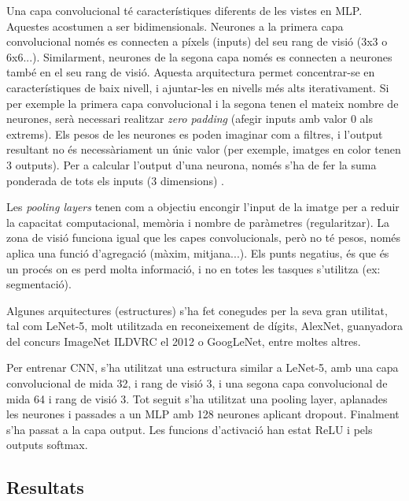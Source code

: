 \documentclass[12pt, spanish]{article}
\begin{document}
Una capa convolucional té característiques diferents de les vistes en MLP. Aquestes acostumen a ser bidimensionals. Neurones a la primera capa convolucional només es connecten a píxels (inputs) del seu rang de visió (3x3 o 6x6...). Similarment, neurones de la segona capa només es connecten a neurones també en el seu rang de visió. Aquesta arquitectura permet concentrar-se en característiques de baix nivell, i ajuntar-les en nivells més alts iterativament. Si per exemple la primera capa convolucional i la segona tenen el mateix nombre de neurones, serà necessari realitzar \textit{zero padding} (afegir inputs amb valor 0 als extrems). Els pesos de les neurones es poden imaginar com a filtres, i l'output resultant no és necessàriament un únic valor (per exemple, imatges en color tenen 3 outputs). Per a calcular l'output d'una neurona, només s'ha de fer la suma ponderada de tots els inputs (3 dimensions) \cite[Cap. 14]{geron2019hands}.

Les \textit{pooling layers} tenen com a objectiu encongir l'input de la imatge per a reduir la capacitat computacional, memòria i nombre de paràmetres (regularitzar). La zona de visió funciona igual que les capes convolucionals, però no té pesos, només aplica una funció d'agregació (màxim, mitjana...). Els punts negatius, és que és un procés on es perd molta informació, i no en totes les tasques s'utilitza (ex: segmentació).

Algunes arquitectures (estructures) s'ha fet conegudes per la seva gran utilitat, tal com LeNet-5, molt utilitzada en reconeixement de dígits, AlexNet, guanyadora del concurs ImageNet ILDVRC el 2012 o GoogLeNet, entre moltes altres.

Per entrenar CNN, s'ha utilitzat una estructura similar a LeNet-5, amb una capa convolucional de mida 32, i rang de visió 3, i una segona capa convolucional de mida 64 i rang de visió 3. Tot seguit s'ha utilitzat una pooling layer, aplanades les neurones i passades a un MLP amb 128 neurones aplicant dropout. Finalment s'ha passat a la capa output. Les funcions d'activació han estat ReLU i pels outputs softmax.








\subsection{Resultats}
\end{document}
